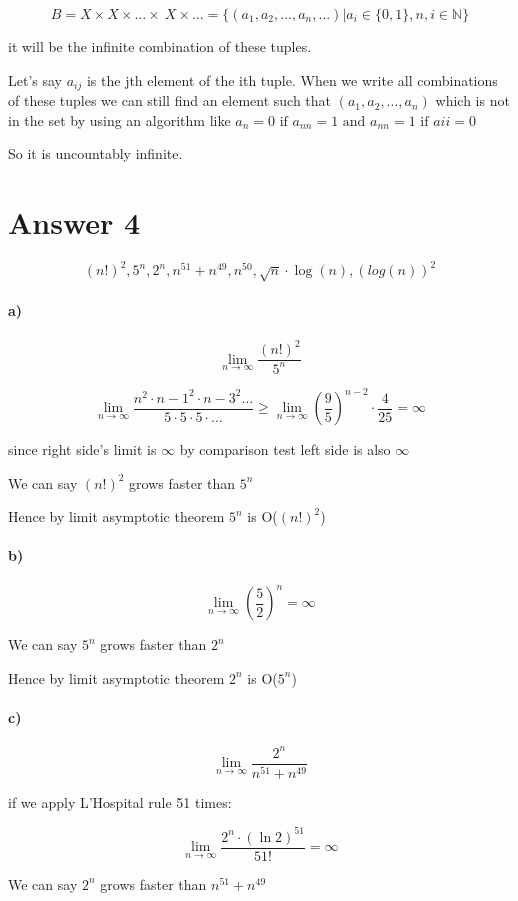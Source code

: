 \documentclass[12pt]{article}
\begin{document}
$$B= X\times X\times...\times\ X \times ...=\{(a_1,a_2,...,a_n,...)|a_i\in \{0,1\},n,i\in \mathbb{N}\}$$

it will be the infinite combination of these tuples.

Let's say $a_{ij}$ is the jth element of the ith tuple. When we write all combinations of these tuples we can still find an element such that $(a_1,a_2,...,a_n)$ which is not in the set by using an algorithm like $a_n = 0 \text{ if } a_{nn}=1 \text{ and } a_{nn} = 1 \text{ if } aii=0$

So it is uncountably infinite.
\section*{Answer 4}
$$(n!)^2, 5^n, 2^n,n^{51}+n^{49},n^{50},\sqrt{n}\cdot\log(n),(log(n))^2$$
\paragraph{a)} 
$$\lim_{n \to \infty} \frac{(n!)^2}{5^n}$$

$$\lim_{n \to \infty} \frac{n^2\cdot{n-1}^2\cdot{n-3}^2...}{5\cdot5\cdot5\cdot...} \geq 
\lim_{n \to \infty} \left( \frac{9}{5} \right)^{n-2}\cdot \frac{4}{25}=\infty$$

since right side's limit is $\infty$ by comparison test left side is also $\infty$

We can say $(n!)^2$ grows faster than $5^n$

Hence by limit asymptotic theorem $5^n$ is O($(n!)^2$) 


\paragraph{b)} 
$$\lim_{n \to \infty} \left(\frac{5}{2}\right)^n = \infty$$

We can say $5^n$ grows faster than $2^n$

Hence by limit asymptotic theorem $2^n$ is O($5^n$) 

\paragraph{c)}
$$\lim_{n \to \infty} \frac{2^n}{n^{51}+n^{49}}$$

if we apply L'Hospital rule 51 times:

$$\lim_{n \to \infty} \frac{2^n\cdot{(\ln2)}^{51}}{51!} = \infty$$

We can say $2^n$ grows faster than $n^{51}+n^{49}$
\end{document}
